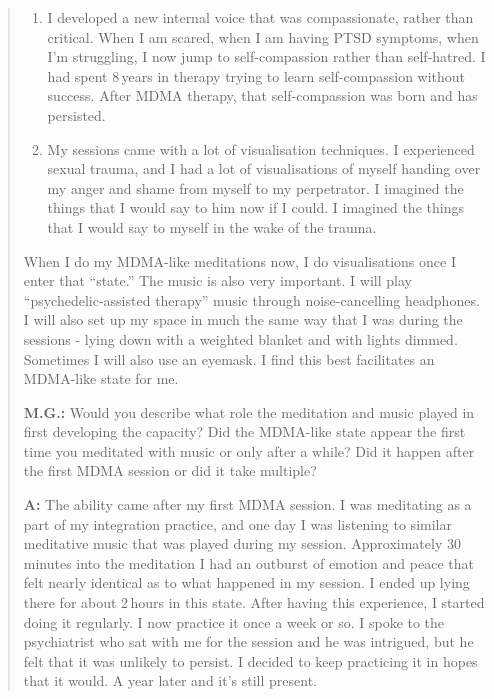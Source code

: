 \documentclass[11pt,oneside]{book}
\begin{document}
\begin{quotation}
    \begin{enumerate}
        \item I developed a new internal voice that was compassionate, rather than critical. When I am scared, when I am having PTSD symptoms, when I'm struggling, I now jump to self-compassion rather than self-hatred. I had spent 8\,years in therapy trying to learn self-compassion without success. After MDMA therapy, that self-compassion was born and has persisted.
        \item My sessions came with a lot of visualisation techniques. I experienced sexual trauma, and I had a lot of visualisations of myself handing over my anger and shame from myself to my perpetrator. I imagined the things that I would say to him now if I could. I imagined the things that I would say to myself in the wake of the trauma.
    \end{enumerate}

    When I do my MDMA-like meditations now, I do visualisations once I enter that \enquote{state.} The music is also very important. I will play \enquote{psychedelic-assisted therapy} music through noise-cancelling headphones. I will also set up my space in much the same way that I was during the sessions - lying down with a weighted blanket and with lights dimmed. Sometimes I will also use an eyemask. I find this best facilitates an MDMA-like state for me.

    \vspace{\baselineskip}

    \textbf{M.G.:} Would you describe what role the meditation and music played in first developing the capacity? Did the MDMA-like state appear the first time you meditated with music or only after a while? Did it happen after the first MDMA session or did it take multiple?

    \textbf{A:} The ability came after my first MDMA session. I was meditating as a part of my integration practice, and one day I was listening to similar meditative music that was played during my session. Approximately 30\,minutes into the meditation I had an outburst of emotion and peace that felt nearly identical as to what happened in my session. I ended up lying there for about 2\,hours in this state. After having this experience, I started doing it regularly. I now practice it once a week or so. I spoke to the psychiatrist who sat with me for the session and he was intrigued, but he felt that it was unlikely to persist. I decided to keep practicing it in hopes that it would. A year later and it's still present.


\end{quotation}
\end{document}
